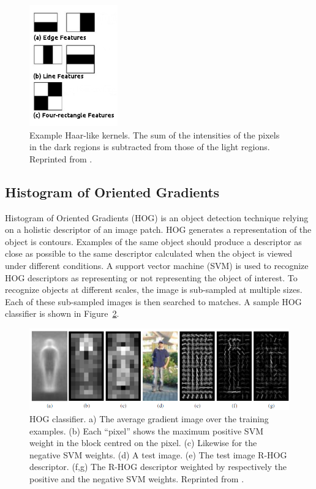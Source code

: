 \begin{figure}[t]
  \centering
  \includegraphics[width=1.5in]{figures/haar.jpg}  
  \caption[Example Haar-like kernels]{Example Haar-like kernels. The sum of the intensities of the pixels in the dark regions is subtracted from those of the light regions. Reprinted from . }
  \label{fig:haar}
\end{figure}



\subsection{Histogram of Oriented Gradients}
Histogram of Oriented Gradients (HOG) \cite{dalal2005histograms} is an object detection technique relying on a holistic descriptor of an image patch. HOG generates a representation of the object is contours. Examples of the same object should produce a descriptor as close as possible to the same descriptor calculated when the object is viewed under different conditions. A support vector machine (SVM) is used to recognize HOG descriptors as representing or not representing the object of interest. To recognize objects at different scales, the image is sub-sampled at multiple sizes. Each of these sub-sampled images is then searched to matches. A sample HOG classifier is shown in Figure~\ref{fig:hog}.

\begin{figure}[t]
  \centering
  \includegraphics[width=5in]{figures/hog.jpg}  
  \caption[HOG classifier]{HOG classifier. a) The average gradient image over the training examples.  (b) Each “pixel”
shows the maximum positive SVM weight in the block centred on the pixel. (c) Likewise for the negative SVM weights. (d) A test image.
(e) The test image R-HOG descriptor. (f,g) The R-HOG descriptor weighted by respectively the positive and the negative SVM weights. Reprinted from . }
  \label{fig:hog}
\end{figure}

